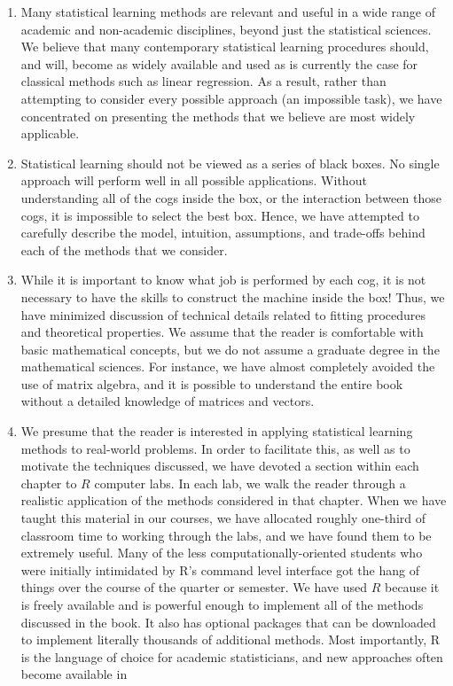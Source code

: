 \documentclass[10pt]{article}
\begin{document}
\begin{enumerate}
  \item Many statistical learning methods are relevant and useful in a wide range of academic and non-academic disciplines, beyond just the statistical sciences. We believe that many contemporary statistical learning procedures should, and will, become as widely available and used as is currently the case for classical methods such as linear regression. As a result, rather than attempting to consider every possible approach (an impossible task), we have concentrated on presenting the methods that we believe are most widely applicable.
  \item Statistical learning should not be viewed as a series of black boxes. No single approach will perform well in all possible applications. Without understanding all of the cogs inside the box, or the interaction between those cogs, it is impossible to select the best box. Hence, we have attempted to carefully describe the model, intuition, assumptions, and trade-offs behind each of the methods that we consider.
  \item While it is important to know what job is performed by each cog, it is not necessary to have the skills to construct the machine inside the box! Thus, we have minimized discussion of technical details related to fitting procedures and theoretical properties. We assume that the reader is comfortable with basic mathematical concepts, but we do not assume a graduate degree in the mathematical sciences. For instance, we have almost completely avoided the use of matrix algebra, and it is possible to understand the entire book without a detailed knowledge of matrices and vectors.
  \item We presume that the reader is interested in applying statistical learning methods to real-world problems. In order to facilitate this, as well as to motivate the techniques discussed, we have devoted a section within each chapter to $R$ computer labs. In each lab, we walk the reader through a realistic application of the methods considered in that chapter. When we have taught this material in our courses, we have allocated roughly one-third of classroom time to working through the labs, and we have found them to be extremely useful. Many of the less computationally-oriented students who were initially intimidated by R's command level interface got the hang of things over the course of the quarter or semester. We have used $R$ because it is freely available and is powerful enough to implement all of the methods discussed in the book. It also has optional packages that can be downloaded to implement literally thousands of additional methods. Most importantly, R is the language of choice for academic statisticians, and new approaches often become available in

\end{enumerate}
\end{document}
